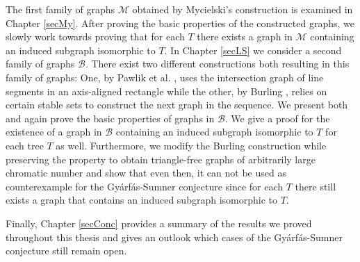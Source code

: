 The first family of graphs $\mathcal{M}$ obtained by Mycielski's construction \cite{My55} is examined in Chapter \ref{secMy}. After proving the basic properties of the constructed graphs, we slowly work towards proving that for each $T$ there exists a graph in $\mathcal{M}$ containing an induced subgraph isomorphic to $T$.
\newpage
In Chapter \ref{secLS} we consider a second family of graphs $\mathcal{B}$. There exist two different constructions both resulting in this family of graphs: One, by Pawlik et al. \cite{Paw14}, uses the intersection graph of line segments in an axis-aligned rectangle while the other, by Burling \cite{Bu65}, relies on certain stable sets to construct the next graph in the sequence. We present both and again prove the basic properties of graphs in $\mathcal{B}$. We give a proof for the existence of a graph in $\mathcal{B}$ containing an induced subgraph isomorphic to $T$ for each tree $T$ as well. Furthermore, we modify the Burling construction while preserving the property to obtain triangle-free graphs of arbitrarily large chromatic number and show that even then, it can not be used as counterexample for the Gyárfás-Sumner conjecture since for each $T$ there still exists a graph that contains an induced subgraph isomorphic to $T$.

Finally, Chapter \ref{secConc} provides a summary of the results we proved throughout this thesis and gives an outlook which cases of the Gyárfás-Sumner conjecture still remain open.